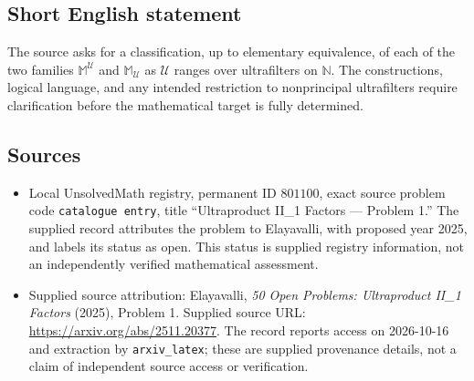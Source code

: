 \documentclass[11pt]{article}
\newcommand{\N}{\mathbb{N}}
\begin{document}
\subsection{Short English statement}
The source asks for a classification, up to elementary equivalence, of each of the two families \(\mathbb M^{\mathcal U}\) and \(\mathbb M_{\mathcal U}\) as \(\mathcal U\) ranges over ultrafilters on \(\N\). The constructions, logical language, and any intended restriction to nonprincipal ultrafilters require clarification before the mathematical target is fully determined.
\subsection{Sources}
\begin{itemize}
\item Local UnsolvedMath registry, permanent ID \(801100\), exact source problem code \texttt{catalogue entry}, title ``Ultraproduct II\_1 Factors --- Problem 1.'' The supplied record attributes the problem to Elayavalli, with proposed year 2025, and labels its status as open. This status is supplied registry information, not an independently verified mathematical assessment.
\item Supplied source attribution: Elayavalli, \emph{50 Open Problems: Ultraproduct II\_1 Factors} (2025), Problem 1. Supplied source URL: \url{https://arxiv.org/abs/2511.20377}. The record reports access on 2026-10-16 and extraction by \texttt{arxiv\_latex}; these are supplied provenance details, not a claim of independent source access or verification.
\end{itemize}
\end{document}
